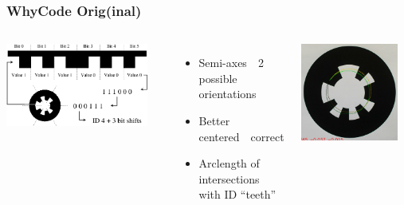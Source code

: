 \documentclass[aspectratio=169]{rubeamer}
\newif\ifpause
\newcommand{\mypause}{\ifpause \pause \fi}
\begin{document}
\begin{frame}
  \frametitle{WhyCode Orig(inal)}
  \begin{columns}
    \includegraphics[width=0.9\textwidth]{whycode_layout}
    \mypause
    \begin{itemize}
      \item Semi-axes~\textrightarrow~2 possible orientations
      \mypause
      \item Better centered~\textrightarrow~correct
      \mypause
      \item Arclength of intersections with ID ``teeth''
    \end{itemize}
    \centering
    \onslide
    \includegraphics[width=0.9\textwidth]{whycode_orig_both_solutions_cropped}
  \end{columns}
\end{frame}
\end{document}
